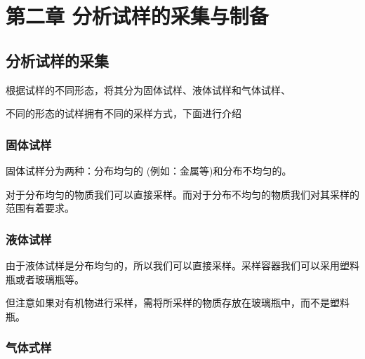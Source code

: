 \section{第二章 分析试样的采集与制备}

\subsection{分析试样的采集}
根据试样的不同形态，将其分为固体试样、液体试样和气体试样、

不同的形态的试样拥有不同的采样方式，下面进行介绍
\subsubsection{固体试样}
固体试样分为两种：分布均匀的 (例如：金属等)和分布不均匀的。

对于分布均匀的物质我们可以直接采样。而对于分布不均匀的物质我们对其采样的范围有着要求。

\subsubsection{液体试样}
由于液体试样是分布均匀的，所以我们可以直接采样。采样容器我们可以采用塑料瓶或者玻璃瓶等。

但注意如果对有机物进行采样，需将所采样的物质存放在玻璃瓶中，而不是塑料瓶。

\subsubsection{气体式样}


